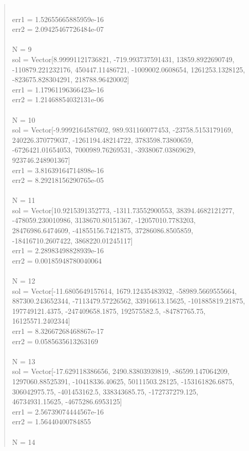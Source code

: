 \documentclass[letterpaper,12pt]{article}
\begin{document}
\begin{quote}
\\err1 = 1.52655665885959e-16
\\err2 = 2.09425467726484e-07
\\
\\N = 9
\\sol = Vector[8.99991121736821, -719.993737591431, 13859.8922690749, -110879.221232176, 450447.11486721, -1009002.0608654, 1261253.1328125, -823675.828304291, 218788.96420002]
\\err1 = 1.17961196366423e-16
\\err2 = 1.21468854032131e-06
\\
\\N = 10
\\sol = Vector[-9.9992164587602, 989.931160077453, -23758.5153179169, 240226.370779037, -1261194.48214722, 3783598.73800659, -6726421.01654053, 7000989.76269531, -3938067.03869629, 923746.248901367]
\\err1 = 3.81639164714898e-16
\\err2 = 8.29218156290765e-05
\\
\\N = 11
\\sol = Vector[10.9215391352773, -1311.73552900553, 38394.4682121277, -478059.230010986, 3138670.80151367, -12057010.7783203, 28476986.6474609, -41855156.7421875, 37286086.8505859, -18416710.2607422, 3868220.01245117]
\\err1 = 2.28983498828939e-16
\\err2 = 0.00185948780040064
\\
\\N = 12
\\sol = Vector[-11.6805649157614, 1679.12435483932, -58989.5669555664, 887300.243652344, -7113479.57226562, 33916613.15625, -101885819.21875, 197749121.4375, -247409658.1875, 192575582.5, -84787765.75, 16125571.2402344]
\\err1 = 8.32667268468867e-17
\\err2 = 0.0585635613263169
\\
\\N = 13
\\sol = Vector[-17.629118386656, 2490.83803939819, -86599.147064209, 1297060.88525391, -10418336.40625, 50111503.28125, -153161826.6875, 306042975.75, -401453162.5, 338343685.75, -172737279.125, 46734931.15625, -4675286.6953125]
\\err1 = 2.56739074444567e-16
\\err2 = 1.56440400784855
\\
\\N = 14

\end{quote}
\end{document}
